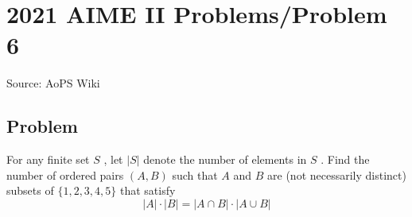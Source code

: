 \documentclass[12pt]{article}
\begin{document}
\section*{{2021 AIME II Problems/Problem 6}}
Source: AoPS Wiki

\subsection*{Problem}
For any finite set $S$ , let $|S|$ denote the number of elements in $S$ . Find the number of ordered pairs $(A,B)$ such that $A$ and $B$ are (not necessarily distinct) subsets of $\{1,2,3,4,5\}$ that satisfy \[|A| \cdot |B| = |A \cap B| \cdot |A \cup B|\]
\end{document}
